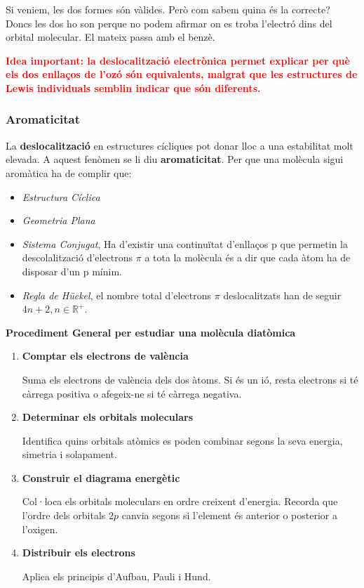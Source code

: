 \documentclass[12pt]{article}
\newcommand{\R}{\mathbb{R}}
\begin{document}
Si veniem, les dos formes són vàlides. Però com sabem quina és la correcte? Doncs les dos ho son perque no podem afirmar on es troba l'electró dins del orbital molecular. El mateix passa amb el benzè.

\textcolor{red}{\textbf{Idea important: la deslocalització electrònica permet explicar per què els dos enllaços de l'ozó són equivalents, malgrat que les estructures de Lewis individuals semblin indicar que són diferents.}}

\subsubsection{Aromaticitat}

La \textbf{deslocalització} en estructures cícliques pot donar lloc a una estabilitat molt elevada. A aquest fenòmen se li diu \textbf{aromaticitat}. Per que una molècula sigui aromàtica ha de complir que:

\begin{itemize}
    \item \textit{Estructura Cíclica}
    \item \textit{Geometria Plana}
    \item \textit{Sistema Conjugat}, Ha d'existir una continuïtat d'enllaços p que permetin la descolalització d'electrons $\pi$ a tota la molècula és a dir que cada àtom ha de disposar d'un p mínim.
    \item \textit{Regla de Hückel}, el nombre total d'electrons $\pi$ deslocalitzats han de seguir $\boxed{4n+2}, n\in \R^+$.
\end{itemize}

\begin{tcolorbox}[
    colback=white,      
    colframe=black,    
    coltext=black,     
    boxrule=1pt,        
    arc=0pt            
]
    \textbf{Procediment General per estudiar una molècula diatòmica}

    \begin{enumerate}
        \item \textbf{Comptar els electrons de valència}

        Suma els electrons de valència dels dos àtoms. Si és un ió, resta electrons si té càrrega positiva o afegeix-ne si té càrrega negativa.

        \item \textbf{Determinar els orbitals moleculars}

        Identifica quins orbitals atòmics es poden combinar segons la seva energia, simetria i solapament.

        \item \textbf{Construir el diagrama energètic}

        Col·loca els orbitals moleculars en ordre creixent d'energia. Recorda que l'ordre dels orbitals \(2p\) canvia segons si l'element és anterior o posterior a l'oxigen.

        \item \textbf{Distribuir els electrons}

        Aplica els principis d'Aufbau, Pauli i Hund.

         \end{enumerate}
\end{tcolorbox}
\end{document}
